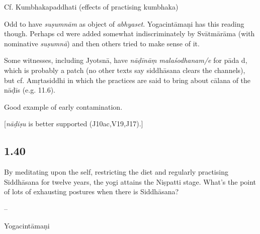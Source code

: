 \begin{ekdosis}
\begin{testimonia}[hp01_039]
Cf. Kumbhakapaddhati (effects of practising kumbhaka)

\begin{versinnote}
\end{versinnote}

\end{testimonia}

\begin{philcomm}[hp01_039]
Odd to have \emph{suṣumnām} as object of \emph{abhyaset}. Yogacintāmaṇi has this reading though. Perhaps cd were added somewhat indiscriminately by Svātmārāma (with nominative \emph{suṣumnā}) and then others tried to make sense of it.

Some witnesses, including Jyotsnā, have \emph{nāḍīnāṃ malaśodhanam/e} for pāda d, which is probably a patch (no other texts say siddhāsana clears the channels), but cf. Amṛtasiddhi in which the practices are said to bring about cālana of the nāḍīs (e.g. 11.6).

Good example of early contamination.

[\emph{nāḍiṣu} is better supported (J10ac,V19,J17).]
\end{philcomm}

\subsection*{1.40}
\begin{translation}[hp01_040]
By meditating upon the self, restricting the diet and regularly practising Siddhāsana for twelve years, the yogi attains the Niṣpatti stage.
What’s the point of lots of exhausting postures when there is Siddhāsana?
\end{translation}

\begin{sources}[hp01_040]
--
\end{sources}

\begin{testimonia}[hp01_040]
Yogacintāmaṇi

\begin{versinnote}
\end{versinnote}


\end{testimonia}
\end{ekdosis}
